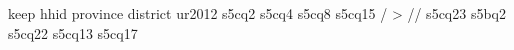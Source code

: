 keep hhid province district ur2012 s5cq2 s5cq4 s5cq8 s5cq15 /
> //
        s5cq23 s5bq2 s5cq22 s5cq13 s5cq17 
